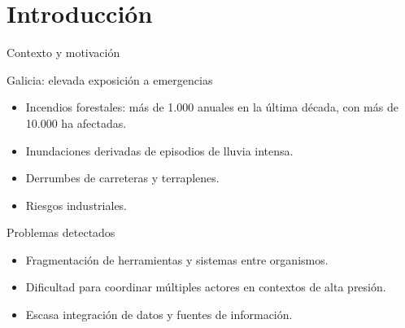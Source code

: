 \section{Introducción}

\begin{frame}[c,shrink]{Contexto y motivación}

\begin{block}{Galicia: elevada exposición a emergencias}
    \begin{itemize}
        \item Incendios forestales: más de 1.000 anuales en la última década, con más de 10.000 ha afectadas.
        \item Inundaciones derivadas de episodios de lluvia intensa.
        \item Derrumbes de carreteras y terraplenes.
        \item Riesgos industriales.
    \end{itemize}
\end{block}

\begin{block}{Problemas detectados}
    \begin{itemize}
        \item Fragmentación de herramientas y sistemas entre organismos.
        \item Dificultad para coordinar múltiples actores en contextos de alta presión.
        \item Escasa integración de datos y fuentes de información.
    \end{itemize}
\end{block}

\end{frame}


